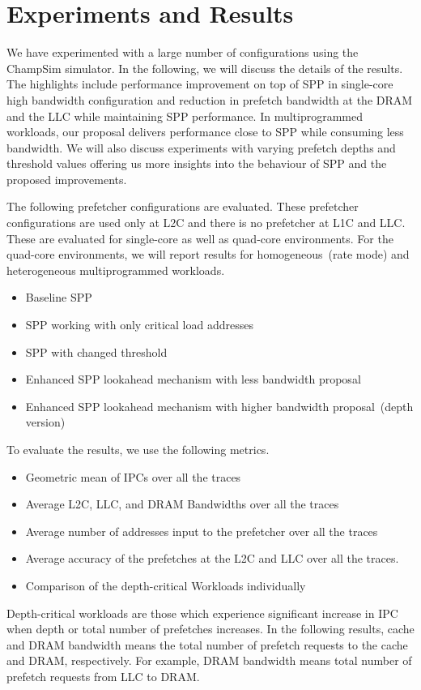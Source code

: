 \chapter{Experiments and Results}\label{Chapter5:Experiments and Results}
We have experimented with a large number of configurations using the ChampSim simulator. In the following, we will discuss the details of the results. The highlights include performance improvement on top of SPP in single-core high bandwidth configuration and reduction in prefetch bandwidth at the DRAM and the LLC while maintaining SPP performance. In multiprogrammed workloads, our proposal delivers performance close to SPP while consuming less bandwidth. We will also discuss experiments with varying prefetch depths and threshold values offering us more insights into the behaviour of SPP and the proposed improvements. 

The following prefetcher configurations are evaluated. These prefetcher configurations are used only at L2C and there is no prefetcher at L1C and LLC. These are evaluated for single-core as well as quad-core environments. For the quad-core environments, we will report results for homogeneous~(rate mode) and heterogeneous multiprogrammed workloads.
\begin{itemize}
    \item{Baseline SPP}
    \item{SPP working with only critical load addresses}
    \item{SPP with changed threshold}
    \item{Enhanced SPP lookahead mechanism with less bandwidth proposal}
    \item{Enhanced SPP lookahead mechanism with higher bandwidth proposal~(depth version)}
\end{itemize}
To evaluate the results, we use the following metrics.
\begin{itemize}
    \item{Geometric mean of IPCs over all the traces}
    \item{Average L2C, LLC,  and DRAM Bandwidths over all the traces}
    \item{Average number of addresses input to the prefetcher over all the traces}
    \item{Average accuracy of the prefetches at the L2C and LLC over all the traces.}
    \item{Comparison of the depth-critical Workloads individually} 
\end{itemize}
Depth-critical workloads are those which experience significant increase in IPC when depth or total number of prefetches increases. In the following results, cache and DRAM bandwidth means the total number of prefetch requests to the cache and DRAM, respectively. For example, DRAM bandwidth means total number of prefetch requests from LLC to DRAM.

